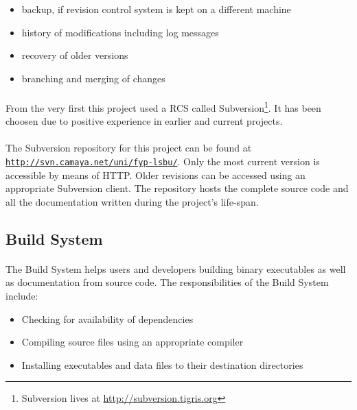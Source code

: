 \begin{itemize}
\item backup, if revision control system is kept on a different machine
\item history of modifications including log messages
\item recovery of older versions
\item branching and merging of changes
\end{itemize}

\paragraph{}
From the very first this project used a RCS called Subversion\footnote{Subversion lives at \href{http://subversion.tigris.org}{http://subversion.tigris.org}}. It has been choosen due to positive experience in earlier and current projects.

\paragraph{}
The Subversion repository for this project can be found at \\ \texttt{\href{http://svn.camaya.net/uni/fyp-lsbu/}{http://svn.camaya.net/uni/fyp-lsbu/}}. Only the most current version is accessible by means of HTTP. Older revisions can be accessed using an appropriate Subversion client. The repository hosts the complete source code and all the documentation written during the project's life-span.


\subsection{Build System}
\paragraph{}
The Build System helps users and developers building binary executables as well as documentation from source code. The responsibilities of the Build System include:

\begin{itemize}
\item Checking for availability of dependencies
\item Compiling source files using an appropriate compiler
\item Installing executables and data files to their destination directories
\end{itemize}

